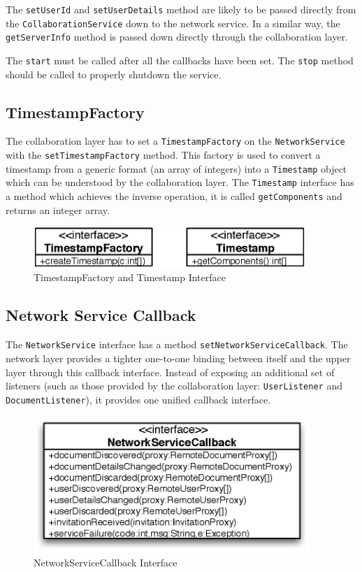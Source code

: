 The \texttt{set\-User\-Id} and \texttt{set\-User\-Details} method are likely to
be passed directly from the \texttt{Collaboration\-Service} down to the
network service. In a similar way, the \texttt{get\-Server\-Info} method is
passed down directly through the collaboration layer.

The \texttt{start} must be called after all the callbacks have been set.
The \texttt{stop} method should be called to properly shutdown the service.


\subsection{TimestampFactory}
The collaboration layer has to set a \texttt{Timestamp\-Factory} on the
\texttt{NetworkService} with the \texttt{set\-Timestamp\-Factory} method. This
factory is used to convert a timestamp from a generic format (an array of
integers) into a \texttt{Timestamp} object which can be understood by the
collaboration layer. The \texttt{Timestamp} interface has a method which 
achieves the inverse operation, it is called \texttt{get\-Components} and
returns an integer array.

\begin{figure}[H]
 \centering
 \includegraphics[width=10.30cm,height=1.55cm]{../images/finalreport/architecture_timestampfactory_uml.eps}
 \caption{TimestampFactory and Timestamp Interface}
\end{figure}


\subsection{Network Service Callback}
The \texttt{NetworkService} interface has a method 
\texttt{setNetworkServiceCallback}. The network layer provides a tighter
one-to-one binding between itself and the upper layer through this
callback interface. Instead of exposing an additional set of listeners
(such as those provided by the collaboration layer: \texttt{UserListener}
and \texttt{DocumentListener}), it provides one unified callback interface.

\begin{figure}[H]
 \centering
 \includegraphics[width=10.44cm,height=5.15cm]{../images/finalreport/architecture_networkservicecallback_uml.eps}
 \caption{NetworkServiceCallback Interface}
\end{figure}


